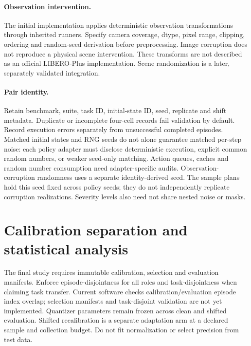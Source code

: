 \documentclass[11pt]{article}
\begin{document}
\paragraph{Observation intervention.}
The initial implementation applies deterministic observation transformations
through inherited runners. Specify camera coverage, dtype, pixel range, clipping,
ordering and random-seed derivation before preprocessing. Image corruption does
not reproduce a physical scene intervention. These transforms are not described
as an official LIBERO-Plus implementation. Scene randomization is a later,
separately validated integration.

\paragraph{Pair identity.}
Retain benchmark, suite, task ID, initial-state ID, seed, replicate and shift
metadata. Duplicate or incomplete four-cell records fail validation by default.
Record execution errors separately from unsuccessful completed episodes.
Matched initial states and RNG seeds do not alone guarantee matched per-step
noise: each policy adapter must disclose deterministic execution, explicit common
random numbers, or weaker seed-only matching. Action queues, caches and random
number consumption need adapter-specific audits.
Observation-corruption randomness uses a separate identity-derived seed. The
sample plans hold this seed fixed across policy seeds; they do not independently
replicate corruption realizations. Severity levels also need not share nested
noise or masks.

\section{Calibration separation and statistical analysis}
The final study requires immutable calibration, selection and evaluation
manifests. Enforce episode-disjointness for all roles and task-disjointness when
claiming task transfer. Current software checks calibration/evaluation episode
index overlap; selection manifests and task-disjoint validation are not yet
implemented. Quantizer parameters remain frozen across clean and shifted evaluation.
Shifted recalibration is a separate adaptation arm at a declared sample and
collection budget. Do not fit normalization or select precision from test data.
\end{document}
